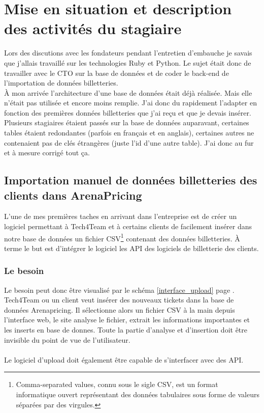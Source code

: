 \chapter{Mise en situation et description des activités du stagiaire}
Lors des discutions avec les fondateurs pendant l'entretien d'embauche je savais que j'allais travaillé sur les technologies Ruby et Python. Le sujet était donc de travailler avec le CTO sur la base de données et de coder le back-end de l'importation de données billetteries.
\\ 

À mon arrivée l'architecture d'une base de données était déjà réalisée. Mais elle n'était pas utilisée et encore moins remplie. J'ai donc du rapidement l'adapter en fonction des premières données billetteries que j'ai reçu et que je devais insérer. Plusieurs stagiaires étaient passés sur la base de données auparavant, certaines tables étaient redondantes (parfois en français et en anglais), certaines autres ne contenaient pas de clés étrangères (juste l'id d'une autre table). J'ai donc au fur et à mesure corrigé tout ça. 


\section{Importation manuel de données billetteries des clients dans ArenaPricing}

L'une de mes premières taches en arrivant dans l'entreprise est de créer un logiciel permettant à Tech4Team et à certains clients de facilement insérer dans notre base de données un fichier CSV\footnote{Comma-separated values, connu sous le sigle CSV, est un format informatique ouvert représentant des données tabulaires sous forme de valeurs séparées par des virgules.} contenant des données billetteries. À terme le but est d'intégrer le logiciel les API des logiciels de billetterie des clients.

\subsection{Le besoin}

Le besoin peut donc être visualisé par le schéma \ref{interface_upload} page \pageref{interface_upload}. Tech4Team ou un client veut insérer des nouveaux tickets dans la base de données Arenapricing. Il sélectionne alors un fichier CSV à la main depuis l'interface web, le site analyse le fichier, extrait les informations importantes et les inserts en base de donnes. Toute la partie d'analyse et d'insertion doit être invisible du point de vue de l'utilisateur.
\\ \\
Le logiciel d'upload doit également être capable de s'interfacer avec des API.

